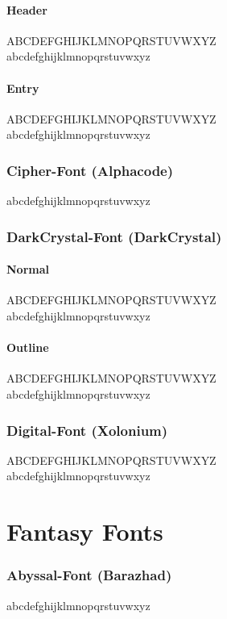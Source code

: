 \documentclass[letterpaper,openany,twoside,twocolumn]{book}
\begin{document}
	\subsubsection{Header}
	{\newspaperHeaderFont ABCDEFGHIJKLMNOPQRSTUVWXYZ}\\
	{\newspaperHeaderFont abcdefghijklmnopqrstuvwxyz}
	\subsubsection{Entry}
	{\newspaperEntryFont ABCDEFGHIJKLMNOPQRSTUVWXYZ}\\
	{\newspaperEntryFont abcdefghijklmnopqrstuvwxyz}
	
	\subsection{Cipher-Font (Alphacode)}
	{\cipherfont abcdefghijklmnopqrstuvwxyz}
	
	\subsection{DarkCrystal-Font (DarkCrystal)}
	\subsubsection{Normal}
	{\darkcrystalfont ABCDEFGHIJKLMNOPQRSTUVWXYZ}\\
	{\darkcrystalfont abcdefghijklmnopqrstuvwxyz}
	\subsubsection{Outline}
	{\darkcrystaloutlinefont ABCDEFGHIJKLMNOPQRSTUVWXYZ}\\
	{\darkcrystaloutlinefont abcdefghijklmnopqrstuvwxyz}
	
	\subsection{Digital-Font (Xolonium)}
	{\digitalfont ABCDEFGHIJKLMNOPQRSTUVWXYZ}\\
	{\digitalfont abcdefghijklmnopqrstuvwxyz}
	
	
	\chapter{Fantasy Fonts}
	
	\subsection{Abyssal-Font (Barazhad)}
	{\abyssalfont abcdefghijklmnopqrstuvwxyz}
	
\end{document}
